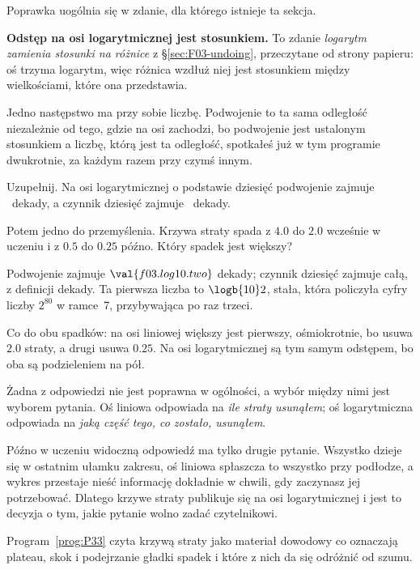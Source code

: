 \begin{fr}
Poprawka uogólnia się w zdanie, dla którego istnieje ta sekcja.

\textbf{Odstęp na osi logarytmicznej jest stosunkiem.} To zdanie
\emph{logarytm zamienia stosunki na różnice} z \S\ref{sec:F03-undoing},
przeczytane od strony papieru: oś trzyma logarytm, więc różnica wzdłuż niej
jest stosunkiem między wielkościami, które ona przedstawia.

Jedno następstwo ma przy sobie liczbę. Podwojenie to ta sama odległość
niezależnie od tego, gdzie na osi zachodzi, bo podwojenie jest ustalonym
stosunkiem \dash{} a liczbę, którą jest ta odległość, spotkałeś już w tym
programie dwukrotnie, za każdym razem przy czymś innym.

Uzupełnij. Na osi logarytmicznej o podstawie dziesięć podwojenie zajmuje
\blank\ dekady, a czynnik dziesięć zajmuje \blank\ dekady.

Potem jedno do przemyślenia. Krzywa straty spada z $\num{4.0}$ do $\num{2.0}$
wcześnie w uczeniu i z $\num{0.5}$ do $\num{0.25}$ późno. Który spadek jest
większy?
\dotline
\nextframe
\end{fr}

\begin{fr}
\begin{ansblock}
Podwojenie zajmuje $\val{f03.log10.two}$ dekady; czynnik dziesięć zajmuje całą,
z definicji dekady. Ta pierwsza liczba to $\logb{10} 2$, stała, która policzyła
cyfry liczby $2^{80}$ w ramce~7, przybywająca po raz trzeci.

Co do obu spadków: na osi liniowej większy jest pierwszy, ośmiokrotnie, bo
usuwa $\num{2.0}$ straty, a drugi usuwa $\num{0.25}$. Na osi logarytmicznej są
tym samym odstępem, bo oba są podzieleniem na pół.
\end{ansblock}

Żadna z odpowiedzi nie jest poprawna w ogólności, a wybór między nimi jest
wyborem pytania. Oś liniowa odpowiada na \emph{ile straty usunąłem}; oś
logarytmiczna odpowiada na \emph{jaką część tego, co zostało, usunąłem}.

Późno w uczeniu widoczną odpowiedź ma tylko drugie pytanie. Wszystko dzieje się
w ostatnim ułamku zakresu, oś liniowa spłaszcza to wszystko przy podłodze, a
wykres przestaje nieść informację dokładnie w chwili, gdy zaczynasz jej
potrzebować. Dlatego krzywe straty publikuje się na osi logarytmicznej i jest
to decyzja o tym, jakie pytanie wolno zadać czytelnikowi.

Program~\ref{prog:P33} czyta krzywą straty jako materiał dowodowy \dash{} co
oznaczają plateau, skok i podejrzanie gładki spadek i które z nich da się
odróżnić od szumu.
\end{fr}

